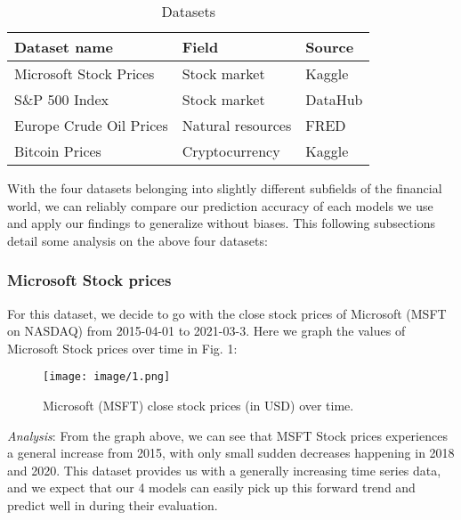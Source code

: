 \documentclass[letterpaper, 10 pt, conference]{ieeeconf}  %
\begin{document}
        \begin{table}[h!] \centering
            \caption{Datasets}
            \begin{threeparttable}
                    \begin{tabular}{lll}
                        \hline
                        Dataset name & Field & Source\\
                        \hline
                        Microsoft Stock Prices & Stock market & Kaggle \cite{venkitesh_2021}\\
                        S\&P 500 Index & Stock market & DataHub \cite{datopian}\\
                        Europe Crude Oil Prices & Natural resources & FRED \cite{fred_2021}\\
                        Bitcoin Prices & Cryptocurrency & Kaggle \cite{srk_2021}\\
                        \hline
                    \end{tabular}
            \end{threeparttable}
        \end{table}

        With the four datasets belonging into slightly different subfields of the financial world, we can reliably compare our prediction accuracy of each models we use and apply our findings to generalize without biases. This following subsections detail some analysis on the above four datasets:

        \subsubsection{Microsoft Stock prices} For this dataset, we decide to go with the close stock prices of Microsoft (MSFT on NASDAQ) from 2015-04-01 to 2021-03-3. Here we graph the values of Microsoft Stock prices over time in Fig. 1:
        \begin{figure}[thpb]
            \centering
            \texttt{[image: image/1.png]}
            \caption{Microsoft (MSFT) close stock prices (in USD) over time.}
            \label{figurelabel}
        \end{figure}
        
        \textit{Analysis}: From the graph above, we can see that MSFT Stock prices experiences a general increase from 2015, with only small sudden decreases happening in 2018 and 2020. This dataset provides us with a generally increasing time series data, and we expect that our 4 models can easily pick up this forward trend and predict well in during their evaluation. 
\end{document}
